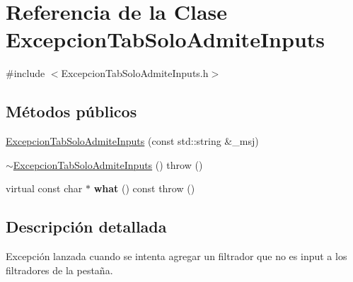 \hypertarget{classExcepcionTabSoloAdmiteInputs}{\section{\-Referencia de la \-Clase \-Excepcion\-Tab\-Solo\-Admite\-Inputs}
\label{classExcepcionTabSoloAdmiteInputs}
}


{\ttfamily \#include $<$\-Excepcion\-Tab\-Solo\-Admite\-Inputs.\-h$>$}

\subsection*{\-Métodos públicos}
\begin{DoxyCompactItemize}
\item 
\hyperlink{classExcepcionTabSoloAdmiteInputs_abb8d7e952d869dc8a200510d1bc6d4f7}{\-Excepcion\-Tab\-Solo\-Admite\-Inputs} (const std\-::string \&\-\_\-msj)
\item 
\hyperlink{classExcepcionTabSoloAdmiteInputs_a1f014998b8fd140325d420b1580a4e0e}{$\sim$\-Excepcion\-Tab\-Solo\-Admite\-Inputs} ()  throw ()
\item 
\hypertarget{classExcepcionTabSoloAdmiteInputs_a46033436ad0d38308c45c37fd4e3de74}{virtual const char $\ast$ {\bfseries what} () const   throw ()}\label{classExcepcionTabSoloAdmiteInputs_a46033436ad0d38308c45c37fd4e3de74}

\end{DoxyCompactItemize}


\subsection{\-Descripción detallada}
\-Excepción lanzada cuando se intenta agregar un filtrador que no es input a los filtradores de la pestaña. 


